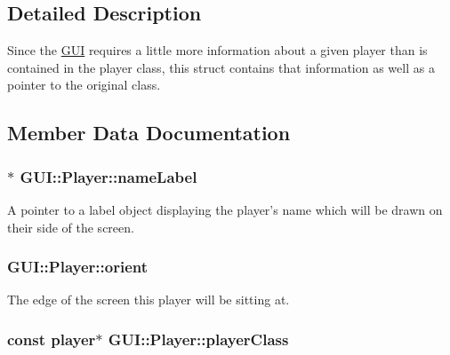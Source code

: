 \subsection{Detailed Description}
Since the \hyperlink{namespaceGUI}{G\-U\-I} requires a little more information about a given player than is contained in the player class, this struct contains that information as well as a pointer to the original class. 

\subsection{Member Data Documentation}
\hypertarget{structGUI_1_1Player_a9119240f399cbce53b8505938d1b7b70}{
\subsubsection[{name\-Label}]{$\ast$ G\-U\-I\-::\-Player\-::name\-Label}}\label{structGUI_1_1Player_a9119240f399cbce53b8505938d1b7b70}


A pointer to a label object displaying the player's name which will be drawn on their side of the screen. 

\hypertarget{structGUI_1_1Player_ab28696f51c4aae54e89c7b0a3c695255}{
\subsubsection[{orient}]{ G\-U\-I\-::\-Player\-::orient}}\label{structGUI_1_1Player_ab28696f51c4aae54e89c7b0a3c695255}


The edge of the screen this player will be sitting at. 

\hypertarget{structGUI_1_1Player_acadd2cb8c209e871196e90b6945d5d45}{
\subsubsection[{player\-Class}]{\setlength{\rightskip}{0pt plus 5cm}const {\bf player}$\ast$ G\-U\-I\-::\-Player\-::player\-Class}}\label{structGUI_1_1Player_acadd2cb8c209e871196e90b6945d5d45}


